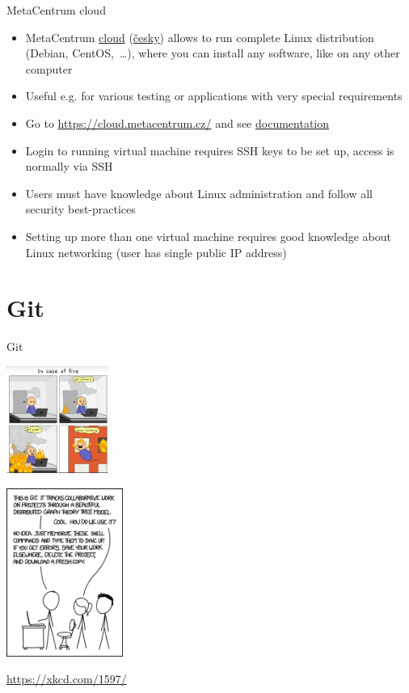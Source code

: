 \documentclass[compress, xelatex, 11pt, xcolor=svgnames, aspectratio=169,
	hyperref={
		bookmarks=true,
		unicode=true,
		colorlinks=true,
		pdftitle={Linux, command line and MetaCentrum},
		plainpages=false,
		pdfauthor={Vojtech Zeisek},
		pdfsubject={Course about use of Linux command line, writing shell scripts and using MetaCentrum of CESNET},
		pdfcreator={XeLaTeX},
		pdfkeywords={Linux, GNU, BASH, shell, command line, MetaCentrum},
		linkcolor=DarkRed, %
		anchorcolor=DarkBlue, %
		citecolor=Indigo, %
		filecolor=NavyBlue, %
		menucolor=DarkMagenta, %
		urlcolor=DarkBlue, %
		},
	url={hyphens, lowtilde} %
	]{beamer}
\begin{document}
\begin{frame}{MetaCentrum cloud}
	\begin{itemize}
		\item MetaCentrum \href{https://wiki.metacentrum.cz/wiki/Kategorie:Clouds}{cloud} (\href{https://wiki.metacentrum.cz/wiki/Kategorie:Cloudy}{česky}) allows to run complete Linux distribution (Debian, CentOS,~\ldots), where you can install any software, like on any other computer
		\item Useful e.g. for various testing or applications with very special requirements
		\item Go to \url{https://cloud.metacentrum.cz/} and see \href{https://docs.cloud.muni.cz/}{documentation}
		\item Login to running virtual machine requires SSH keys to be set up, access is normally via SSH
		\item Users must have knowledge about Linux administration and follow all security best-practices
		\item Setting up more than one virtual machine requires good knowledge about Linux networking (user has single public IP address)
	\end{itemize}
\end{frame}

\section{Git}

\begin{frame}{Git}
	\begin{multicols}{2}
		\vfill
		\tableofcontents[currentsection, sectionstyle=show/hide, hideothersubsections]
		\vfill
		\begin{center}
			\includegraphics[height=3.5cm]{git_fire.png}
		\end{center}
		\columnbreak
		\begin{center}
			\includegraphics[height=5.5cm]{git_xkcd.png}
		\end{center}
		\begin{flushright}
			\url{https://xkcd.com/1597/}
		\end{flushright}
	\end{multicols}
\end{frame}
\end{document}
